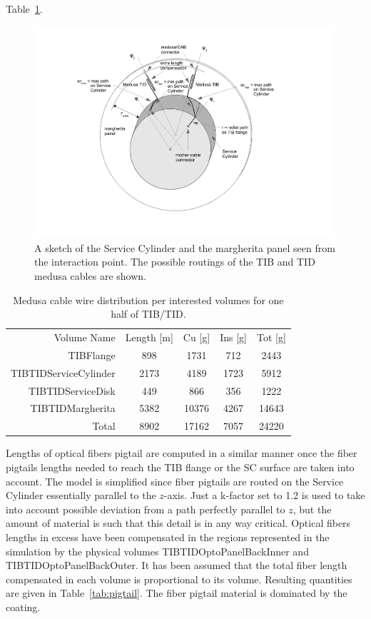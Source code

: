 Table~\ref{tab:medusa}.
%
\begin{figure}[h]
\includegraphics*[width=0.99\textwidth]{fig/cilindro.pdf}
\caption{A sketch of the Service Cylinder and the margherita panel seen from the interaction point. The possible routings of the TIB and TID medusa cables are shown.}
\label{fig:cilindro}
\end{figure}
%

\begin{table}[h!]
  \caption{Medusa cable wire distribution per interested volumes for one half of TIB/TID.}
  \label{tab:medusa}
  \begin{center}
    \begin{tabular}{rcccc}
Volume Name  & Length [m]  & Cu [g]  & Ins [g] & Tot [g] \\ 
TIBFlange             &         898 &  1731 &   712 & 2443  \\
TIBTIDServiceCylinder &        2173 &  4189 &  1723 & 5912  \\
TIBTIDServiceDisk     &         449 &   866 &   356 & 1222  \\
TIBTIDMargherita      &        5382 & 10376 &  4267 & 14643 \\
Total	              &        8902 & 17162 &  7057 & 24220 \\
    \end{tabular}
  \end{center}
\end{table}

Lengths of optical fibers pigtail are computed in a similar manner
once the fiber pigtails lengths needed to reach the TIB flange or the
SC surface are taken into account. The model is simplified since fiber
pigtails are routed on the Service Cylinder essentially parallel to
the $z$-axis. Just a k-factor set to 1.2 is used to take into account
possible deviation from a path perfectly parallel to $z$, but the amount
of material is such that this detail is in any way critical. Optical
fibers lengths in excess have been compensated in the regions
represented in the simulation by the physical volumes
TIBTIDOptoPanelBackInner  and TIBTIDOptoPanelBackOuter. It has been
assumed that the total fiber length compensated in each volume is
proportional to its volume. Resulting quantities are given in
Table~\ref{tab:pigtail}. The fiber pigtail material is dominated by
the coating.


